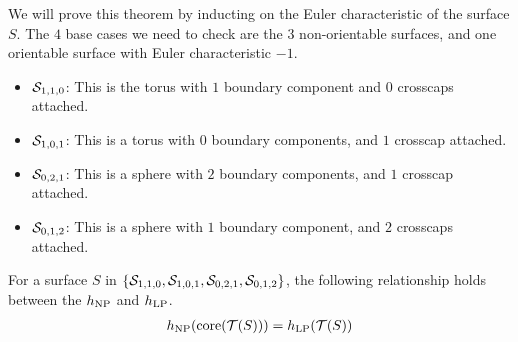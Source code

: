\documentclass[12pt, reqno]{amsart}
\begin{document}
We will prove this theorem by inducting on the Euler characteristic of the surface $S$.
The $4$ base cases we need to check are the $3$ non-orientable surfaces, and one orientable surface with Euler characteristic $-1$.
\begin{itemize}
\item $\mathcal{S}_{1,1,0}$: This is the torus with $1$ boundary component and $0$ crosscaps attached.
\item $\mathcal{S}_{1,0,1}$: This is a torus with $0$ boundary components, and $1$ crosscap attached.
\item $\mathcal{S}_{0,2,1}$: This is a sphere with $2$ boundary components, and $1$ crosscap attached.
\item $\mathcal{S}_{0,1,2}$: This is a sphere with $1$ boundary component, and $2$ crosscaps attached.
\end{itemize}


\begin{lemma}
  \label{lem:entropy-equality-base-case}
  For a surface $S$ in $\left\{ \mathcal{S}_{1,1,0}, \mathcal{S}_{1,0,1}, \mathcal{S}_{0,2,1}, \mathcal{S}_{0,1,2} \right\}$, the following relationship holds between the $h_{\mathrm{NP}}$ and $h_{\mathrm{LP}}$.
  \begin{align*}
    h_{\mathrm{NP}}(\mathrm{core}(\mathcal{T}(S))) = h_{\mathrm{LP}}(\mathcal{T}(S))
  \end{align*}
\end{lemma}
\end{document}

